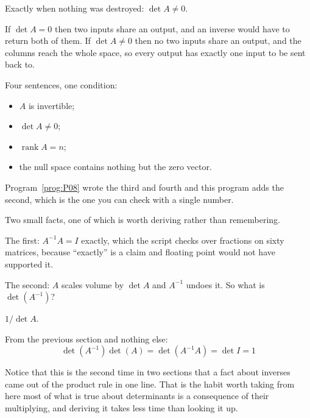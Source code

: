 \begin{fr}
\begin{ansblock}
Exactly when nothing was destroyed: $\det A \ne 0$.
\end{ansblock}

If $\det A = 0$ then two inputs share an output, and an inverse would have to
return both of them. If $\det A \ne 0$ then no two inputs share an output, and
the columns reach the whole space, so every output has exactly one input to be
sent back to.

Four sentences, one condition:

\begin{itemize}
\item $A$ is invertible;
\item $\det A \ne 0$;
\item $\operatorname{rank} A = n$;
\item the null space contains nothing but the zero vector.
\end{itemize}

Program~\ref{prog:P08} wrote the third and fourth and this program adds the
second, which is the one you can check with a single number.
\end{fr}

\begin{fr}
Two small facts, one of which is worth deriving rather than remembering.

The first: $A^{-1}A = I$ exactly, which the script checks over fractions on
sixty matrices, because \enquote{exactly} is a claim and floating point would
not have supported it.

The second: $A$ scales volume by $\det A$ and $A^{-1}$ undoes it. So what is
$\det(A^{-1})$?
\dotline
\nextframe
\end{fr}

\begin{fr}
\begin{ansblock}
$1/\det A$.
\end{ansblock}

From the previous section and nothing else:
\[ \det(A^{-1})\det(A) = \det(A^{-1}A) = \det I = 1 \]

Notice that this is the second time in two sections that a fact about inverses
came out of the product rule in one line. That is the habit worth taking from
here \dash{} most of what is true about determinants is a consequence of their
multiplying, and deriving it takes less time than looking it up.
\end{fr}


